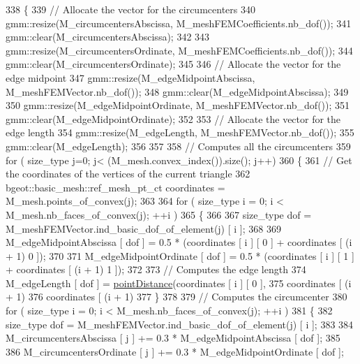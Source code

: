 \begin{DoxyCode}
338 \{
339     \textcolor{comment}{// Allocate the vector for the circumcenters}
340     gmm::resize(M\_circumcentersAbscissa, M\_meshFEMCoefficients.nb\_dof());
341     gmm::clear(M\_circumcentersAbscissa);
342 
343     gmm::resize(M\_circumcentersOrdinate, M\_meshFEMCoefficients.nb\_dof());
344     gmm::clear(M\_circumcentersOrdinate);
345 
346     \textcolor{comment}{// Allocate the vector for the edge midpoint}
347     gmm::resize(M\_edgeMidpointAbscissa, M\_meshFEMVector.nb\_dof());
348     gmm::clear(M\_edgeMidpointAbscissa);
349 
350     gmm::resize(M\_edgeMidpointOrdinate, M\_meshFEMVector.nb\_dof());
351     gmm::clear(M\_edgeMidpointOrdinate);
352 
353     \textcolor{comment}{// Allocate the vector for the edge length}
354     gmm::resize(M\_edgeLength, M\_meshFEMVector.nb\_dof());
355     gmm::clear(M\_edgeLength);
356     
357     
358     \textcolor{comment}{// Computes all the circumcenters}
359     \textcolor{keywordflow}{for} ( size\_type j=0; j< (M\_mesh.convex\_index()).size(); j++)
360     \{   
361         \textcolor{comment}{// Get the coordinates of the vertices of the current triangle}
362         bgeot::basic\_mesh::ref\_mesh\_pt\_ct coordinates = M\_mesh.points\_of\_convex(j);
363 
364         \textcolor{keywordflow}{for} ( size\_type i = 0; i < M\_mesh.nb\_faces\_of\_convex(j); ++i )
365         \{
366             
367             size\_type dof = M\_meshFEMVector.ind\_basic\_dof\_of\_element(j) [ i ];
368 
369             M\_edgeMidpointAbscissa [ dof ] = 0.5 * (coordinates [ i ] [ 0 ] + coordinates [ (i + 1) %
       0 ]);
370 
371             M\_edgeMidpointOrdinate [ dof ] = 0.5 * (coordinates [ i ] [ 1 ] + coordinates [ (i + 1) %
       1 ]);
372             
373             \textcolor{comment}{// Computes the edge length}
374             M\_edgeLength [ dof ] = \hyperlink{UsefulFunctions_8h_ad9cf8f3fe42287349e8e1b2f1f824958}{pointDistance}(coordinates [ i ] [ 0 ],
375                                     coordinates [ (i + 1) %
376                                     coordinates [ (i + 1) %
377         \}
378 
379         \textcolor{comment}{// Computes the circumcenter}
380         \textcolor{keywordflow}{for} ( size\_type i = 0; i < M\_mesh.nb\_faces\_of\_convex(j); ++i )
381         \{
382             size\_type dof = M\_meshFEMVector.ind\_basic\_dof\_of\_element(j) [ i ];
383             
384             M\_circumcentersAbscissa [ j ] += 0.3 * M\_edgeMidpointAbscissa [ dof ];
385             
386             M\_circumcentersOrdinate [ j ] += 0.3 * M\_edgeMidpointOrdinate [ dof ];

\end{DoxyCode}
